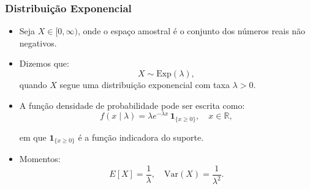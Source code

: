 \documentclass[
  letterpaper,
  DIV=11,
  numbers=noendperiod]{scrreprt}
\begin{document}
\subsubsection*{Distribuição
Exponencial}\label{distribuiuxe7uxe3o-exponencial}

\begin{itemize}
\item
  Seja \(X \in [0, \infty)\), onde o espaço amostral é o conjunto dos
  números reais não negativos.
\item
  Dizemos que: \[X \sim \text{Exp}(\lambda),\] quando \(X\) segue uma
  distribuição exponencial com taxa \(\lambda > 0\).
\item
  A função densidade de probabilidade pode ser escrita como:
  \[f(x \mid \lambda) = \lambda e^{-\lambda x} \, \mathbf{1}_{\{x \geq 0\}}, \quad x \in \mathbb{R},\]

  em que \(\mathbf{1}_{\{x \geq 0\}}\) é a função indicadora do suporte.
\item
  Momentos:
  \[E[X] = \frac{1}{\lambda}, \quad \text{Var}(X) = \frac{1}{\lambda^2}.\]
\end{itemize}
\end{document}

